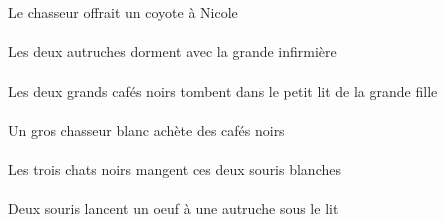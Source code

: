 \begin{exe}
\ex\gll
\DEFSgErg{}   \chasseurCSgErg{}    \INDSgDat{}   \NicoleBSgDat{}   \INDSgAbs{}   \coyoteCSgAbs{}  \offrirVdPstCSg{}\\
\DEFSgErgP{}   \chasseurCSgErgP{}    \INDSgDatP{}   \NicoleBSgDatP{}   \INDSgAbsP{}   \coyoteCSgAbsP{}  \offrirVdPstCSgP{}\\
Le chasseur offrait un coyote à Nicole
\ex\gll
\DEFDuAbs{}   \autrucheBDuAbs{}    \DEFSgObl{}   \grandASg{}   \infirmiereASgObl{}   \AVEC{}  \dormirViPrsBDu{}\\
\DEFDuAbsP{}   \autrucheBDuAbsP{}    \DEFSgOblP{}   \grandASgP{}   \infirmiereASgOblP{}   \AVECP{}  \dormirViPrsBDuP{}\\
Les deux autruches dorment avec la grande infirmière
\ex\gll
\DEFDuAbs{}   \grandCDu{}   \noirCDu{}   \cafeCDuAbs{}    \DEFSgObl{}    \DEFSgObl{}   \grandCSg{}   \filleCSgObl{}   \DE{}   \petitDSg{}   \litDSgObl{}   \DANS{}  \tomberViPrsCDu{}\\
\DEFDuAbsP{}   \grandCDuP{}   \noirCDuP{}   \cafeCDuAbsP{}    \DEFSgOblP{}    \DEFSgOblP{}   \grandCSgP{}   \filleCSgOblP{}   \DEP{}   \petitDSgP{}   \litDSgOblP{}   \DANSP{}  \tomberViPrsCDuP{}\\
Les deux grands cafés noirs tombent dans le petit lit de la grande fille
\ex\gll
\INDSgErg{}   \grosCSg{}   \blancCSg{}   \chasseurCSgErg{}   \INDPlAbs{}   \noirCPl{}   \cafeCPlAbs{}  \acheterVtPrsCPl{}\\
\INDSgErgP{}   \grosCSgP{}   \blancCSgP{}   \chasseurCSgErgP{}   \INDPlAbsP{}   \noirCPlP{}   \cafeCPlAbsP{}  \acheterVtPrsCPlP{}\\
Un gros chasseur blanc achète des cafés noirs
\ex\gll
\DEFPlErg{}   \troisDPl{}   \noirDPl{}   \chatDPlErg{}   \DEMDuAbs{}   \blancBDu{}   \sourisBDuAbs{}  \mangerVtPrsBDu{}\\
\DEFPlErgP{}   \troisDPlP{}   \noirDPlP{}   \chatDPlErgP{}   \DEMDuAbsP{}   \blancBDuP{}   \sourisBDuAbsP{}  \mangerVtPrsBDuP{}\\
Les trois chats noirs mangent ces deux souris blanches
\ex\gll
\DEFSgObl{}   \litDSgObl{}   \SOUS{}   \INDDuErg{}   \sourisBDuErg{}    \INDSgDat{}   \autrucheBSgDat{}   \INDSgAbs{}   \oeufCSgAbs{}  \lancerVdPrsCSg{}\\
\DEFSgOblP{}   \litDSgOblP{}   \SOUSP{}   \INDDuErgP{}   \sourisBDuErgP{}    \INDSgDatP{}   \autrucheBSgDatP{}   \INDSgAbsP{}   \oeufCSgAbsP{}  \lancerVdPrsCSgP{}\\
Deux souris lancent un oeuf à une autruche sous le lit
\ex\gll
\DEFSgErg{}   \litDSgErg{}   \INDDuAbs{}   \grosDDu{}   \blancDDu{}   \chatDDuAbs{}  \supporterVtPstDDu{}\\

\end{exe}
